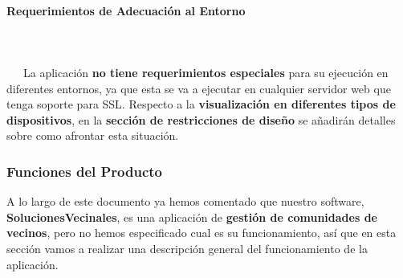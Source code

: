 \paragraph{Requerimientos de Adecuación al Entorno}
~\\\\
\-\ \-\ \-\ La aplicación \textbf{no tiene requerimientos especiales} para su ejecución en diferentes entornos, ya que esta se va a ejecutar en cualquier servidor web que tenga soporte para SSL. Respecto a la \textbf{visualización en diferentes tipos de dispositivos}, en la \textbf{sección de restricciones de diseño} se añadirán detalles sobre como afrontar esta situación.

\subsubsection{Funciones del Producto}
A lo largo de este documento ya hemos comentado que nuestro software, \textbf{SolucionesVecinales}, es una aplicación de \textbf{gestión de comunidades de vecinos}, pero no hemos especificado cual es su funcionamiento, así que en esta sección vamos a realizar una descripción general del funcionamiento de la aplicación.

